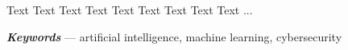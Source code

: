 \thispagestyle{plain} %
\chapter*{\abstractname}
Text Text Text Text Text Text Text Text Text ...

\textbf{\textit{Keywords}} --- artificial intelligence, machine learning, cybersecurity

